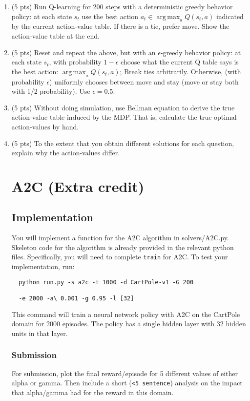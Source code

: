 \documentclass[a4paper]{article}
\theoremstyle{definition}
\DeclareMathOperator*{\argmax}{arg\,max}
\begin{document}
\begin{enumerate}
\item (5 pts) Run Q-learning for 200 steps with a deterministic greedy behavior policy: at each state $s_t$ use the best action $a_t \in \argmax_a Q(s_t,a)$ indicated by the current action-value table. If there is a tie, prefer move. Show the action-value table at the end.

\item (5 pts) Reset and repeat the above, but with an $\epsilon$-greedy behavior policy: at each state $s_t$, with probability $1-\epsilon$ choose what the current Q table says is the best action: $\argmax_a Q(s_t,a)$; Break ties arbitrarily. Otherwise, (with probability $\epsilon$) uniformly chooses between move and stay (move or stay both with 1/2 probability). Use $\epsilon=0.5$.

\item (5 pts) Without doing simulation, use Bellman equation to derive the true action-value table induced by the MDP. That is, calculate the true optimal action-values by hand.

\item (5 pts) To the extent that you obtain different solutions for each question, explain why the action-values  differ.

\section{A2C (Extra credit)}
\subsection{Implementation}

You will implement a function for the A2C algorithm in solvers/A2C.py.
% 
Skeleton code for the algorithm is already provided in the relevant python files.
% 
Specifically, you will need to complete \verb|train| for A2C.
% 
To test your implementation, run:
% 
\begin{verbatim}
  python run.py -s a2c -t 1000 -d CartPole-v1 -G 200 
  
  -e 2000 -a\ 0.001 -g 0.95 -l [32]
\end{verbatim}
% 
This command will train a neural network policy with A2C on the CartPole domain for 2000 episodes.
% 
The policy has a single hidden layer with 32 hidden units in that layer.
\subsubsection*{Submission}
% 

For submission, plot the final reward/episode for 5 different values of either alpha or gamma. Then include a short (\verb|<5 sentence|) analysis on the impact that alpha/gamma had for the reward in this domain.



\end{enumerate}
\end{document}
